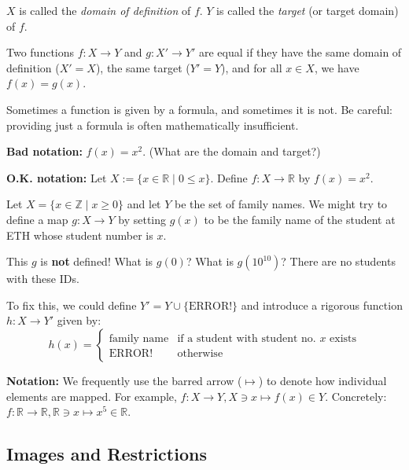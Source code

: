 $X$ is called the \textit{domain of definition} of $f$. 
$Y$ is called the \textit{target} (or target domain) of $f$.

\begin{definition}
Two functions $f: X \to Y$ and $g: X' \to Y'$ are equal if they have the same domain of definition ($X' = X$), the same target ($Y' = Y$), and for all $x \in X$, we have $f(x) = g(x)$.
\end{definition}

Sometimes a function is given by a formula, and sometimes it is not. Be careful: providing just a formula is often mathematically insufficient.

\begin{example}
\textbf{Bad notation:} $f(x) = x^2$. (What are the domain and target?)

\textbf{O.K. notation:} Let $X := \{x \in \mathbb{R} \mid 0 \le x\}$. Define $f: X \to \mathbb{R}$ by $f(x) = x^2$.
\end{example}

\begin{example}
Let $X = \{x \in \mathbb{Z} \mid x \ge 0\}$ and let $Y$ be the set of family names. We might try to define a map $g: X \to Y$ by setting $g(x)$ to be the family name of the student at ETH whose student number is $x$.

This $g$ is \textbf{not} defined! What is $g(0)$? What is $g(10^{10})$? There are no students with these IDs. 

To fix this, we could define $Y' = Y \cup \{\text{ERROR!}\}$ and introduce a rigorous function $h: X \to Y'$ given by:
\[
h(x) = 
\begin{cases} 
\text{family name} & \text{if a student with student no. } x \text{ exists} \\
\text{ERROR!} & \text{otherwise}
\end{cases}
\]
\end{example}

\begin{remark}
\textbf{Notation:} We frequently use the barred arrow ($\mapsto$) to denote how individual elements are mapped. For example, $f: X \to Y, X \ni x \mapsto f(x) \in Y$. 
Concretely: $f: \mathbb{R} \to \mathbb{R}, \mathbb{R} \ni x \mapsto x^5 \in \mathbb{R}$.
\end{remark}

\subsection{Images and Restrictions}

